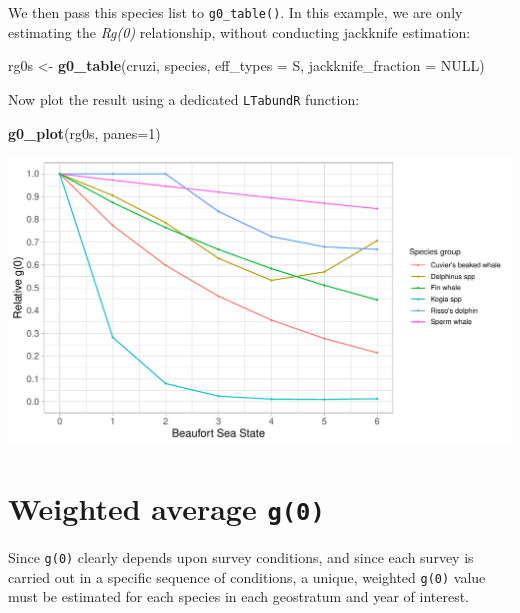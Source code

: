 \documentclass[
]{book}
\newenvironment{Shaded}{\begin{snugshade}}{\end{snugshade}}
\newcommand{\AttributeTok}[1]{\textcolor[rgb]{0.13,0.29,0.53}{#1}}
\newcommand{\ConstantTok}[1]{\textcolor[rgb]{0.56,0.35,0.01}{#1}}
\newcommand{\DecValTok}[1]{\textcolor[rgb]{0.00,0.00,0.81}{#1}}
\newcommand{\FunctionTok}[1]{\textcolor[rgb]{0.13,0.29,0.53}{\textbf{#1}}}
\newcommand{\NormalTok}[1]{#1}
\newcommand{\OtherTok}[1]{\textcolor[rgb]{0.56,0.35,0.01}{#1}}
\newcommand{\StringTok}[1]{\textcolor[rgb]{0.31,0.60,0.02}{#1}}
\begin{document}
We then pass this species list to \texttt{g0\_table()}. In this example, we are only estimating the \emph{Rg(0)} relationship, without conducting jackknife estimation:

\begin{Shaded}
\begin{Highlighting}[]
\NormalTok{rg0s }\OtherTok{\textless{}{-}} \FunctionTok{g0\_table}\NormalTok{(cruzi,}
\NormalTok{               species,}
               \AttributeTok{eff\_types =} \StringTok{\textquotesingle{}S\textquotesingle{}}\NormalTok{,}
               \AttributeTok{jackknife\_fraction =} \ConstantTok{NULL}\NormalTok{)}
\end{Highlighting}
\end{Shaded}

Now plot the result using a dedicated \texttt{LTabundR} function:

\begin{Shaded}
\begin{Highlighting}[]
\FunctionTok{g0\_plot}\NormalTok{(rg0s, }\AttributeTok{panes=}\DecValTok{1}\NormalTok{)}
\end{Highlighting}
\end{Shaded}

\includegraphics{figures/unnamed-chunk-211-1.pdf}

\hypertarget{weighted-average-g0}{%
\section*{\texorpdfstring{Weighted average \texttt{g(0)}}{Weighted average g(0)}}\label{weighted-average-g0}}

Since \texttt{g(0)} clearly depends upon survey conditions, and since each survey is carried out in a specific sequence of conditions, a unique, weighted \texttt{g(0)} value must be estimated for each species in each geostratum and year of interest.
\end{document}
